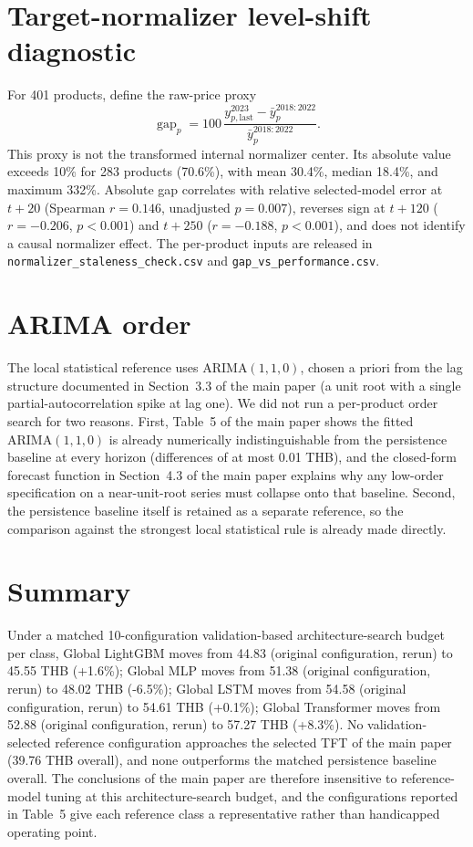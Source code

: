 \documentclass[11pt]{article}
\begin{document}
\clearpage
\section{Target-normalizer level-shift diagnostic}
For 401 products, define the raw-price proxy
\[
\operatorname{gap}_p=100\,
\frac{y^{2023}_{p,\mathrm{last}}-\bar y^{2018:2022}_p}
{\bar y^{2018:2022}_p}.
\]
This proxy is not the transformed internal normalizer center. Its absolute
value exceeds 10\% for 283 products (70.6\%), with mean 30.4\%, median 18.4\%,
and maximum 332\%. Absolute gap correlates with relative selected-model error
at $t{+}20$ (Spearman $r=0.146$, unadjusted $p=0.007$), reverses sign at
$t{+}120$ ($r=-0.206$, $p<0.001$) and $t{+}250$ ($r=-0.188$, $p<0.001$), and
does not identify a causal normalizer effect. The per-product inputs are
released in \texttt{normalizer\_staleness\_check.csv} and
\texttt{gap\_vs\_performance.csv}.

\section{ARIMA order}
The local statistical reference uses $\text{ARIMA}(1,1,0)$, chosen a priori from the lag structure documented in Section~3.3 of the main paper (a unit root with a single partial-autocorrelation spike at lag one). We did not run a per-product order search for two reasons. First, Table~5 of the main paper shows the fitted $\text{ARIMA}(1,1,0)$ is already numerically indistinguishable from the persistence baseline at every horizon (differences of at most 0.01 THB), and the closed-form forecast function in Section~4.3 of the main paper explains why any low-order specification on a near-unit-root series must collapse onto that baseline. Second, the persistence baseline itself is retained as a separate reference, so the comparison against the strongest local statistical rule is already made directly.

\section{Summary}
Under a matched 10-configuration validation-based architecture-search budget per class, Global LightGBM moves from 44.83 (original configuration, rerun) to 45.55 THB (+1.6\%); Global MLP moves from 51.38 (original configuration, rerun) to 48.02 THB (-6.5\%); Global LSTM moves from 54.58 (original configuration, rerun) to 54.61 THB (+0.1\%); Global Transformer moves from 52.88 (original configuration, rerun) to 57.27 THB (+8.3\%). No validation-selected reference configuration approaches the selected TFT of the main paper (39.76 THB overall), and none outperforms the matched persistence baseline overall. The conclusions of the main paper are therefore insensitive to reference-model tuning at this architecture-search budget, and the configurations reported in Table~5 give each reference class a representative rather than handicapped operating point.
\end{document}
